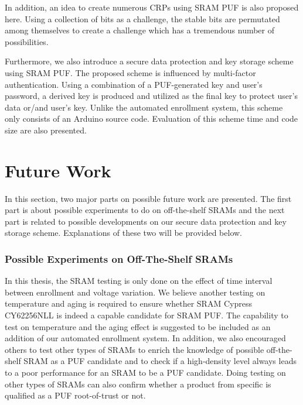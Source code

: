 
In addition, an idea to create numerous CRPs using SRAM PUF is also proposed here. Using a collection of bits as a challenge, the stable bits are permutated among themselves to create a challenge which has a tremendous number of possibilities.

Furthermore, we also introduce a secure data protection and key storage scheme using SRAM PUF. The proposed scheme is influenced by multi-factor authentication. Using a combination of a PUF-generated key and user's password, a derived key is produced and utilized as the final key to protect user's data or/and user's key. Unlike the automated enrollment system, this scheme only consists of an Arduino source code. Evaluation of this scheme time and code size are also presented.


\section{Future Work}

In this section, two major parts on possible future work are presented. The first part is about possible experiments to do on off-the-shelf SRAMs and the next part is related to possible developments on our secure data protection and key storage scheme. Explanations of these two will be provided below.

\subsubsection{Possible Experiments on Off-The-Shelf SRAMs}
In this thesis, the SRAM testing is only done on the effect of time interval between enrollment and voltage variation. We believe another testing on temperature and aging is required to ensure whether SRAM Cypress CY62256NLL is indeed a capable candidate for SRAM PUF. The capability to test on temperature and the aging effect is suggested to be included as an addition of our automated enrollment system.
In addition, we also encouraged others to test other types of SRAMs to enrich the knowledge of possible off-the-shelf SRAM as a PUF candidate and to check if a high-density level always leads to a poor performance for an SRAM to be a PUF candidate. Doing testing on other types of SRAMs can also confirm whether a product from specific is qualified as a PUF root-of-trust or not.


